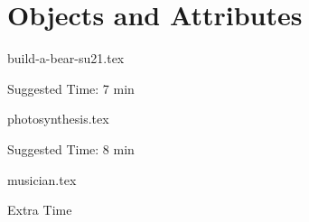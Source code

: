 \documentclass{exam}
\begin{document}
\section{Objects and Attributes}
\begin{questions}
    {build-a-bear-su21.tex}
    \begin{questionmeta}
        Suggested Time: 7 min
    \end{questionmeta}

    {photosynthesis.tex}
    \begin{questionmeta}
        Suggested Time: 8 min
    \end{questionmeta}


    {musician.tex}
    \begin{questionmeta}
        Extra Time
    \end{questionmeta}
\end{questions}
\end{document}
